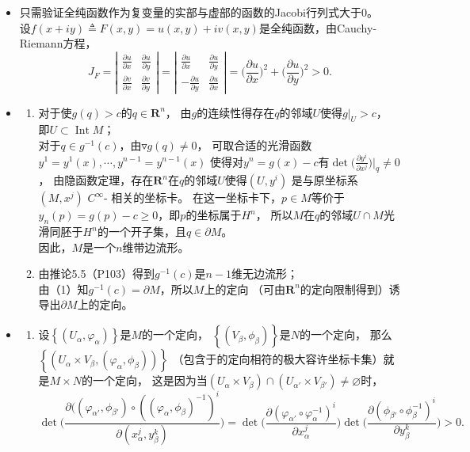 \begin{itemize}
    \item[38.]
    只需验证全纯函数作为复变量的实部与虚部的函数的Jacobi行列式大于$0$。
    \\
    设$f(x+iy)\triangleq F(x,y)=u(x,y)+iv(x,y)$是全纯函数，由Cauchy-Riemann方程，
    \[
    J_F=\left|\begin{array}{cc}
     \frac{\partial u}{\partial x} & \frac{\partial u}{\partial y} \\
    \frac{\partial v}{\partial x} & \frac{\partial v}{\partial y}
    \end{array}\right|
    =\left|\begin{array}{cc}
     \frac{\partial u}{\partial x} & \frac{\partial u}{\partial y} \\
    -\frac{\partial u}{\partial y} & \frac{\partial u}{\partial x}
    \end{array}\right|
    =\Big(\frac{\partial u}{\partial x}\Big)^2
    +\Big(\frac{\partial u}{\partial y}\Big)^2>0.
    \]

    \item[39.]
    \begin{enumerate}
    \item[(1)] 对于使$g(q)>c$的$q\in\mathbf{R}^n$，
    由$g$的连续性得存在$q$的邻域$U$使得$g|_U>c$，
    即$U\subset\operatorname{Int}M$；
    \\
    对于$q\in g^{-1}(c)$，由$\triangledown g(q)\neq0$，
    可取合适的光滑函数$y^1=y^1(x),\cdots, y^{n-1}=y^{n-1}(x)$
    使得对$y^n=g(x)-c$有$\det\big(\frac{\partial y^i}{\partial x^j}\big)|_q\neq0$，
    由隐函数定理，存在$\mathbf{R}^n$在$q$的邻域$U$使得$(U,y^i)$
    是与原坐标系$(M,x^j)$ $C^\infty$- 相关的坐标卡。
    在这一坐标卡下，$p\in M$等价于$y_n(p)=g(p)-c\geq0$，即$p$的坐标属于$H^n$，
    所以$M$在$q$的邻域$U\cap M$光滑同胚于$H^n$的一个开子集，且$q\in\partial M$。
    \\
    因此，$M$是一个$n$维带边流形。
    
    \item[(2)] 由推论5.5（P103）得到$g^{-1}(c)$是$n-1$维无边流形；
    \\
    由（1）知$g^{-1}(c)=\partial M$，所以$M$上的定向
    （可由$\mathbf{R}^n$的定向限制得到）诱导出$\partial M$上的定向。
    \end{enumerate}

    \item[40.]
    \begin{enumerate}
        \item[(1)] 设$\left\{(U_\alpha,\varphi_\alpha)\right\}$是$M$的一个定向，
    $\left\{(V_\beta,\phi_\beta)\right\}$是$N$的一个定向，
    那么$\left\{(U_\alpha\times V_\beta,(\varphi_\alpha,\phi_\beta))\right\}$
    （包含于的定向相符的极大容许坐标卡集）就是$M\times N$的一个定向，
    这是因为当$(U_\alpha\times V_\beta)\cap(U_{\alpha'}\times V_{\beta'})\neq\varnothing$时，
    \[
    \det\Big(\frac{\partial((\varphi_{\alpha'},\phi_{\beta'})
    \circ((\varphi_\alpha,\phi_\beta)^{-1})^{i}}
    {\partial (x_{\alpha}^j,y_{\beta}^k)}\Big)
    =\det\Big(\frac{\partial(\varphi_{\alpha'}\circ\varphi_\alpha^{-1})^{i}}{\partial x_\alpha^j}\Big)
    \det\Big(\frac{\partial(\phi_{\beta'}\circ\phi_\beta^{-1})^{i}}{\partial y_\beta^k}\Big)>0.
    \]


\end{enumerate}
\end{itemize}
